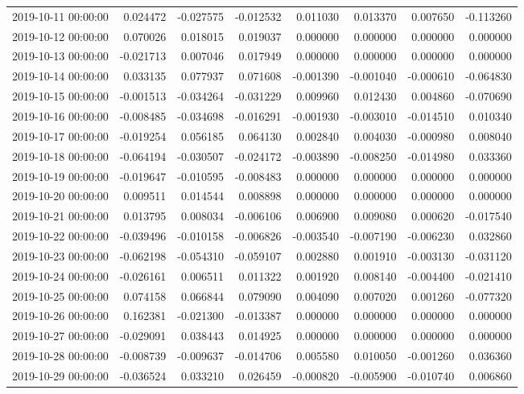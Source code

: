 \begin{tabular}{lrrrrrrr}
2019-10-11 00:00:00 & 0.024472 & -0.027575 & -0.012532 & 0.011030 & 0.013370 & 0.007650 & -0.113260 \\
2019-10-12 00:00:00 & 0.070026 & 0.018015 & 0.019037 & 0.000000 & 0.000000 & 0.000000 & 0.000000 \\
2019-10-13 00:00:00 & -0.021713 & 0.007046 & 0.017949 & 0.000000 & 0.000000 & 0.000000 & 0.000000 \\
2019-10-14 00:00:00 & 0.033135 & 0.077937 & 0.071608 & -0.001390 & -0.001040 & -0.000610 & -0.064830 \\
2019-10-15 00:00:00 & -0.001513 & -0.034264 & -0.031229 & 0.009960 & 0.012430 & 0.004860 & -0.070690 \\
2019-10-16 00:00:00 & -0.008485 & -0.034698 & -0.016291 & -0.001930 & -0.003010 & -0.014510 & 0.010340 \\
2019-10-17 00:00:00 & -0.019254 & 0.056185 & 0.064130 & 0.002840 & 0.004030 & -0.000980 & 0.008040 \\
2019-10-18 00:00:00 & -0.064194 & -0.030507 & -0.024172 & -0.003890 & -0.008250 & -0.014980 & 0.033360 \\
2019-10-19 00:00:00 & -0.019647 & -0.010595 & -0.008483 & 0.000000 & 0.000000 & 0.000000 & 0.000000 \\
2019-10-20 00:00:00 & 0.009511 & 0.014544 & 0.008898 & 0.000000 & 0.000000 & 0.000000 & 0.000000 \\
2019-10-21 00:00:00 & 0.013795 & 0.008034 & -0.006106 & 0.006900 & 0.009080 & 0.000620 & -0.017540 \\
2019-10-22 00:00:00 & -0.039496 & -0.010158 & -0.006826 & -0.003540 & -0.007190 & -0.006230 & 0.032860 \\
2019-10-23 00:00:00 & -0.062198 & -0.054310 & -0.059107 & 0.002880 & 0.001910 & -0.003130 & -0.031120 \\
2019-10-24 00:00:00 & -0.026161 & 0.006511 & 0.011322 & 0.001920 & 0.008140 & -0.004400 & -0.021410 \\
2019-10-25 00:00:00 & 0.074158 & 0.066844 & 0.079090 & 0.004090 & 0.007020 & 0.001260 & -0.077320 \\
2019-10-26 00:00:00 & 0.162381 & -0.021300 & -0.013387 & 0.000000 & 0.000000 & 0.000000 & 0.000000 \\
2019-10-27 00:00:00 & -0.029091 & 0.038443 & 0.014925 & 0.000000 & 0.000000 & 0.000000 & 0.000000 \\
2019-10-28 00:00:00 & -0.008739 & -0.009637 & -0.014706 & 0.005580 & 0.010050 & -0.001260 & 0.036360 \\
2019-10-29 00:00:00 & -0.036524 & 0.033210 & 0.026459 & -0.000820 & -0.005900 & -0.010740 & 0.006860 \\

\end{tabular}
